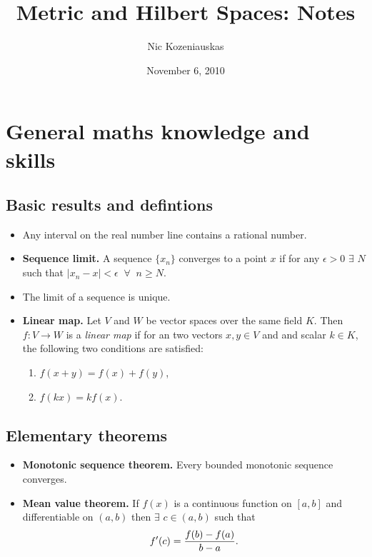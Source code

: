 \documentclass[two column]{article}
\title{Metric and Hilbert Spaces: Notes}
\author{Nic Kozeniauskas}
\date{November 6, 2010}                                           %
\begin{document}
\maketitle

\tableofcontents

\section{General maths knowledge and skills}

\subsection{Basic results and defintions}

\begin{itemize}
\item Any interval on the real number line contains a rational number. 
\item {\bf Sequence limit.} A sequence $\{ x_{n} \}$ converges to a point $x$ if for any $\epsilon > 0$ $\exists$ $N$ such that $\lvert x_{n} - x \rvert < \epsilon \;\; \forall \;\; n \geq N$.
\item The limit of a sequence is unique. 
\item {\bf Linear map.} Let $V$ and $W$ be vector spaces over the same field $K$. Then $f:V \rightarrow W$ is a \emph{linear map} if for an two vectors $x,y \in V$ and and scalar $k \in K$, the following two conditions are satisfied:
\begin{enumerate}
\item $f(x + y) = f(x) + f(y)$,
\item $f(kx) = kf(x)$. 
\end{enumerate}
\end{itemize}

\subsection{Elementary theorems}

\begin{itemize}
\item {\bf Monotonic sequence theorem.} Every bounded monotonic sequence converges. 
\item {\bf Mean value theorem.} If $f(x)$ is a continuous function on $[a,b]$ and differentiable on $(a,b)$ then $\exists$ $c \in (a,b)$ such that 
\[f'(c) = \frac{f(b)-f(a)}{b-a}.
\vspace{-6pt}\]
\end{itemize}
\end{document}
